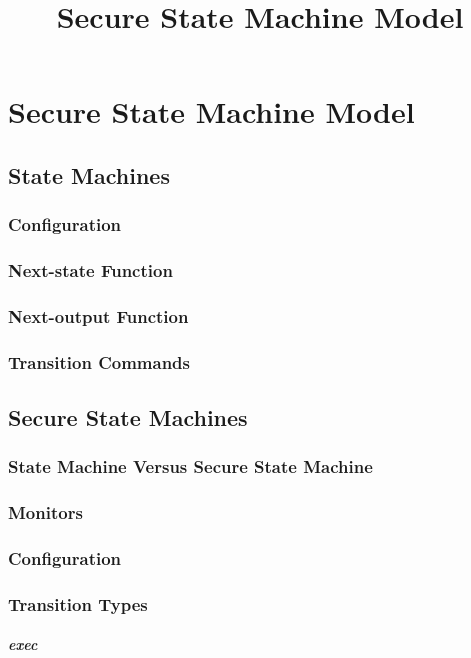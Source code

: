 \documentclass[../../main/main.tex]{subfiles}
\begin{document}
\title{Secure State Machine Model}

\chapter{Secure State Machine Model}\label{chp:ssmmodel}

\section{State Machines}\label{sec:sm}
\subsection{Configuration}
\subsection{Next-state Function}
\subsection{Next-output Function}
\subsection{Transition Commands}

\section{Secure State Machines}\label{sec:ssm}

\subsection{State Machine Versus Secure State Machine}
\subsection{Monitors}\label{monitors}
\subsection{Configuration}
\subsection{Transition Types}
\subsubsection{\textit{exec}}
\end{document}
